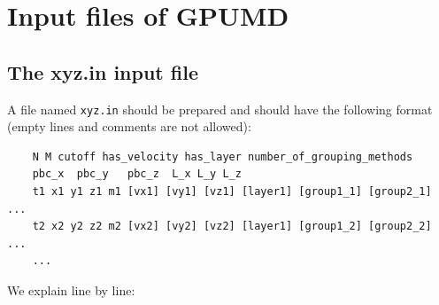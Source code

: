 \documentclass[12pt,a4paper]{report}
\begin{document}
\section{Input files of GPUMD}


\subsection{The xyz.in input file}

A file named \verb"xyz.in" should be prepared and should have the following format (empty lines and comments are not allowed):
\begin{verbatim}
    N M cutoff has_velocity has_layer number_of_grouping_methods
    pbc_x  pbc_y   pbc_z  L_x L_y L_z
    t1 x1 y1 z1 m1 [vx1] [vy1] [vz1] [layer1] [group1_1] [group2_1] ...
    t2 x2 y2 z2 m2 [vx2] [vy2] [vz2] [layer1] [group1_2] [group2_2] ...
    ...
\end{verbatim}
We explain line by line:
\end{document}
